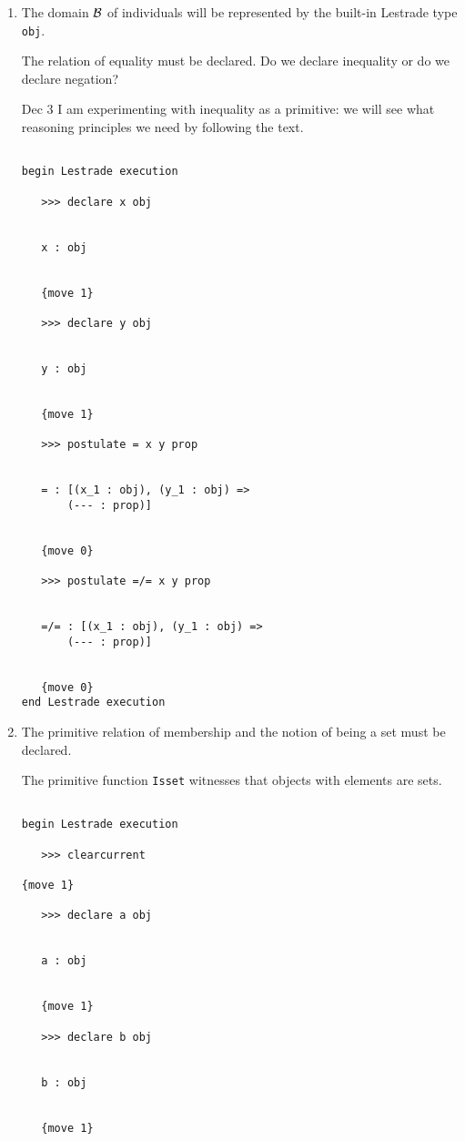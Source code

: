 \documentclass[12pt]{article}
\begin{document}
\begin{enumerate}

\item The domain $\cal B$ of individuals will be represented by the built-in Lestrade type {\tt obj}.

The relation of equality must be declared.  Do we declare inequality or do we declare negation?

Dec 3 I am experimenting with inequality as a primitive:  we will see what reasoning principles we need by following the text.

\begin{verbatim}

begin Lestrade execution

   >>> declare x obj


   x : obj


   {move 1}

   >>> declare y obj


   y : obj


   {move 1}

   >>> postulate = x y prop


   = : [(x_1 : obj), (y_1 : obj) => 
       (--- : prop)]


   {move 0}

   >>> postulate =/= x y prop


   =/= : [(x_1 : obj), (y_1 : obj) => 
       (--- : prop)]


   {move 0}
end Lestrade execution

\end{verbatim}


\item The primitive relation of membership and the notion of being a set must be declared.

The primitive function {\tt Isset} witnesses that objects with elements are sets.

\begin{verbatim}

begin Lestrade execution

   >>> clearcurrent

{move 1}

   >>> declare a obj


   a : obj


   {move 1}

   >>> declare b obj


   b : obj


   {move 1}


\end{verbatim}
\end{enumerate}
\end{document}
